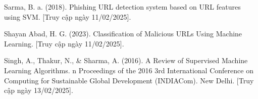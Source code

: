\documentclass[13pt]{article}
\begin{document}
\begin{thebibliography}{99}
Sarma, B. a. (2018). Phishing URL detection system based on URL features using SVM. [Truy cập ngày 11/02/2025].

Shayan Abad, H. G. (2023). Classification of Malicious URLs Using Machine Learning. [Truy cập ngày 11/02/2025].

Singh, A., Thakur, N., \& Sharma, A. (2016). A Review of Supervised Machine Learning Algorithms. n Proceedings of the 2016 3rd International Conference on Computing for Sustainable Global Development (INDIACom). New Delhi. [Truy cập ngày 13/02/2025].

\end{thebibliography}
\end{document}
